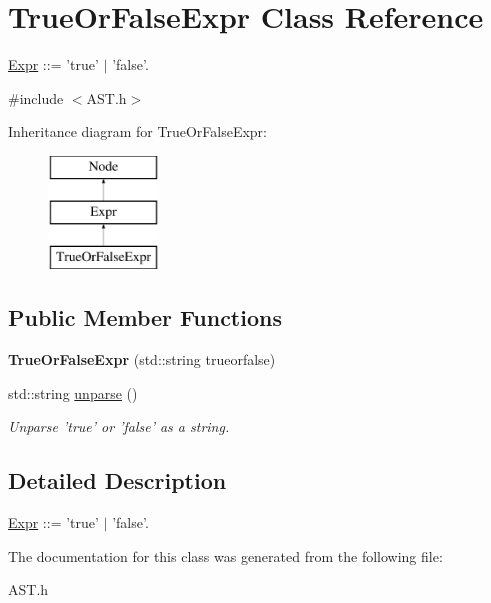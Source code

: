 \hypertarget{classTrueOrFalseExpr}{\section{True\-Or\-False\-Expr Class Reference}
\label{classTrueOrFalseExpr}
}


\hyperlink{classExpr}{Expr} \-:\-:= 'true' $\vert$ 'false'.  




{\ttfamily \#include $<$A\-S\-T.\-h$>$}

Inheritance diagram for True\-Or\-False\-Expr\-:\begin{figure}[H]
\begin{center}
\leavevmode
\includegraphics[height=3.000000cm]{classTrueOrFalseExpr}
\end{center}
\end{figure}
\subsection*{Public Member Functions}
\begin{DoxyCompactItemize}
\item 
\hypertarget{classTrueOrFalseExpr_a35003fbd229b0a2a863205119799a36b}{{\bfseries True\-Or\-False\-Expr} (std\-::string trueorfalse)}\label{classTrueOrFalseExpr_a35003fbd229b0a2a863205119799a36b}

\item 
\hypertarget{classTrueOrFalseExpr_a3b981c8f3803f2a2520c7feef1d0ca0b}{std\-::string \hyperlink{classTrueOrFalseExpr_a3b981c8f3803f2a2520c7feef1d0ca0b}{unparse} ()}\label{classTrueOrFalseExpr_a3b981c8f3803f2a2520c7feef1d0ca0b}

\begin{DoxyCompactList}\small\item\em Unparse 'true' or 'false' as a string. \end{DoxyCompactList}\end{DoxyCompactItemize}


\subsection{Detailed Description}
\hyperlink{classExpr}{Expr} \-:\-:= 'true' $\vert$ 'false'. 

The documentation for this class was generated from the following file\-:\begin{DoxyCompactItemize}
\item 
A\-S\-T.\-h\end{DoxyCompactItemize}
